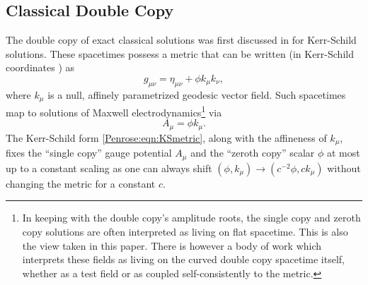\subsection{Classical Double Copy}\label{Penrose:sec:dc}
The double copy of exact classical solutions was first discussed in
\cite{Monteiro:2014cda} for Kerr-Schild solutions. These spacetimes possess a metric that can be written (in
Kerr-Schild coordinates \cite{Kerr:1965vyg}) as 
\begin{equation} \label{Penrose:eqn:KSmetric} 
    g_{\mu \nu} = \eta_{\mu \nu} + \phi k_{\mu} k_{\nu},
\end{equation}
where $k_{\mu}$ is a null, affinely parametrized geodesic vector field. Such spacetimes map to solutions of Maxwell
electrodynamics\footnote{In keeping with the double copy's amplitude roots, the single copy and zeroth copy
solutions are often interpreted as living on flat spacetime. This is also the view taken in this paper. There is
however a body of work
\cite{Didenko:2022qxq,Liang:2023zxo,Farnsworth:2023mff,Han:2022ubu,Han:2022mze,Alkac:2021bav,Gurses:2018ckx,Prabhu:2020avf,Carrillo-Gonzalez:2017iyj,Bahjat-Abbas:2017htu,Luna:2015paa,Alawadhi:2020jrv} which interprets these fields as living on the curved double copy spacetime itself,
whether as a test field or as coupled self-consistently to the metric.} via
\begin{equation} \label{Penrose:eqn:KSgauge} 
    A_{\mu} = \phi k_{\mu}.
\end{equation}
The Kerr-Schild form \eqref{Penrose:eqn:KSmetric}, along with the affineness of $k_{\mu}$, fixes the ``single copy'' gauge
potential $A_{\mu}$ and the ``zeroth copy'' scalar $\phi$ at most up to a constant scaling as one can always shift $(\phi, k_{\mu}) \to
(c^{-2} \phi, c k_{\mu})$ without changing the metric for a constant $c$. 

